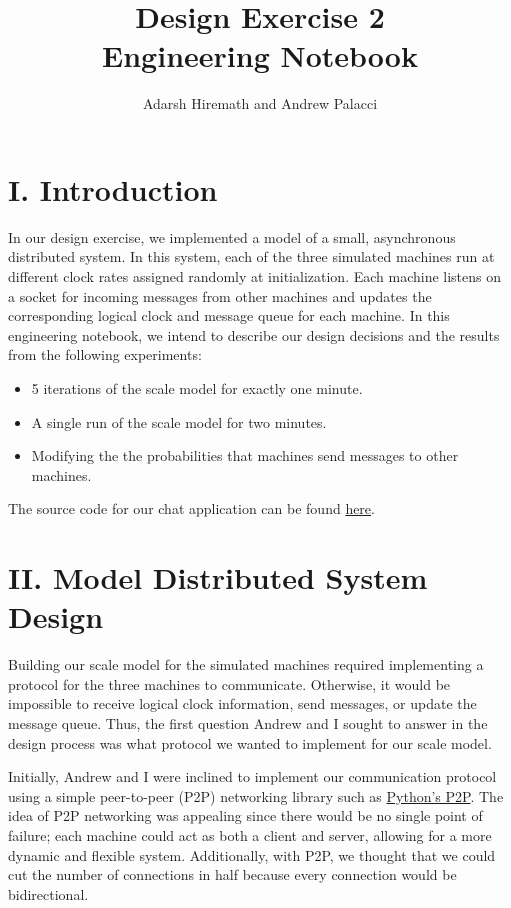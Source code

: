 \documentclass[
	a4paper, %
	10pt, %
	unnumberedsections, %
	twoside, %
]{LTJournalArticle}
\title{Design Exercise 2\\ Engineering Notebook} %
\author{%
	Adarsh Hiremath and Andrew Palacci
}
\begin{document}
\maketitle %


\section{I. Introduction}
In our design exercise, we implemented a model of a small, asynchronous distributed system. In this system, each of the three simulated machines run at different clock rates assigned randomly at initialization. Each machine listens on a socket for incoming messages from other machines and updates the corresponding logical clock and message queue for each machine. In this engineering notebook, we intend to describe our design decisions and the results from the following experiments:
\begin{itemize}
    \item 5 iterations of the scale model for exactly one minute. 
    \item A single run of the scale model for two minutes.
    \item Modifying the the probabilities that machines send messages to other machines. 
\end{itemize}

The source code for our chat application can be found \href{https://github.com/andrewp2303/logical_clocks}{here}.

\section{II. Model Distributed System Design}

Building our scale model for the simulated machines required implementing a protocol for the three machines to communicate. Otherwise, it would be impossible to receive logical clock information, send messages, or update the message queue. Thus, the first question Andrew and I sought to answer in the design process was what protocol we wanted to implement for our scale model. 

Initially, Andrew and I were inclined to implement our communication protocol using a simple peer-to-peer (P2P) networking library such as \href{https://pypi.org/project/pyp2p/}{Python's P2P}. The idea of P2P networking was appealing since there would be no single point of failure;  each machine could act as both a client and server, allowing for a more dynamic and flexible system. Additionally, with P2P, we thought that we could cut the number of connections in half because every connection would be bidirectional. 
\end{document}
